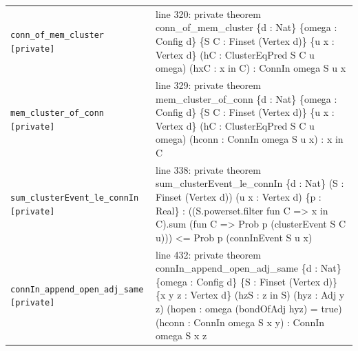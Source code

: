 \documentclass[10pt]{article}
\begin{document}
\begin{longtable}{>{\raggedright\arraybackslash}p{} >{\raggedright\arraybackslash}p{}}
\texttt{conn\_\allowbreak{}of\_\allowbreak{}mem\_\allowbreak{}cluster [private]} & {\ttfamily\scriptsize line 320:\allowbreak{} private theorem conn\_\allowbreak{}of\_\allowbreak{}mem\_\allowbreak{}cluster \{d :\allowbreak{} Nat\} \{omega :\allowbreak{} Config d\} \{S C :\allowbreak{} Finset (\allowbreak{}Vertex d)\allowbreak{}\} \{u x :\allowbreak{} Vertex d\} (\allowbreak{}hC :\allowbreak{} ClusterEqPred S C u omega)\allowbreak{} (\allowbreak{}hxC :\allowbreak{} x in C)\allowbreak{} :\allowbreak{} ConnIn omega S u x} \\[0.45em]
\texttt{mem\_\allowbreak{}cluster\_\allowbreak{}of\_\allowbreak{}conn [private]} & {\ttfamily\scriptsize line 329:\allowbreak{} private theorem mem\_\allowbreak{}cluster\_\allowbreak{}of\_\allowbreak{}conn \{d :\allowbreak{} Nat\} \{omega :\allowbreak{} Config d\} \{S C :\allowbreak{} Finset (\allowbreak{}Vertex d)\allowbreak{}\} \{u x :\allowbreak{} Vertex d\} (\allowbreak{}hC :\allowbreak{} ClusterEqPred S C u omega)\allowbreak{} (\allowbreak{}hconn :\allowbreak{} ConnIn omega S u x)\allowbreak{} :\allowbreak{} x in C} \\[0.45em]
\texttt{sum\_\allowbreak{}clusterEvent\_\allowbreak{}le\_\allowbreak{}connIn [private]} & {\ttfamily\scriptsize line 338:\allowbreak{} private theorem sum\_\allowbreak{}clusterEvent\_\allowbreak{}le\_\allowbreak{}connIn \{d :\allowbreak{} Nat\} (\allowbreak{}S :\allowbreak{} Finset (\allowbreak{}Vertex d)\allowbreak{})\allowbreak{} (\allowbreak{}u x :\allowbreak{} Vertex d)\allowbreak{} \{p :\allowbreak{} Real\} :\allowbreak{} (\allowbreak{}(\allowbreak{}S.\allowbreak{}powerset.\allowbreak{}filter fun C =\allowbreak{}> x in C)\allowbreak{}.\allowbreak{}sum (\allowbreak{}fun C =\allowbreak{}> Prob p (\allowbreak{}clusterEvent S C u)\allowbreak{})\allowbreak{})\allowbreak{} <=\allowbreak{} Prob p (\allowbreak{}connInEvent S u x)\allowbreak{}} \\[0.45em]
\texttt{connIn\_\allowbreak{}append\_\allowbreak{}open\_\allowbreak{}adj\_\allowbreak{}same [private]} & {\ttfamily\scriptsize line 432:\allowbreak{} private theorem connIn\_\allowbreak{}append\_\allowbreak{}open\_\allowbreak{}adj\_\allowbreak{}same \{d :\allowbreak{} Nat\} \{omega :\allowbreak{} Config d\} \{S :\allowbreak{} Finset (\allowbreak{}Vertex d)\allowbreak{}\} \{x y z :\allowbreak{} Vertex d\} (\allowbreak{}hzS :\allowbreak{} z in S)\allowbreak{} (\allowbreak{}hyz :\allowbreak{} Adj y z)\allowbreak{} (\allowbreak{}hopen :\allowbreak{} omega (\allowbreak{}bondOfAdj hyz)\allowbreak{} =\allowbreak{} true)\allowbreak{} (\allowbreak{}hconn :\allowbreak{} ConnIn omega S x y)\allowbreak{} :\allowbreak{} ConnIn omega S x z} \\[0.45em]

\end{longtable}
\end{document}
